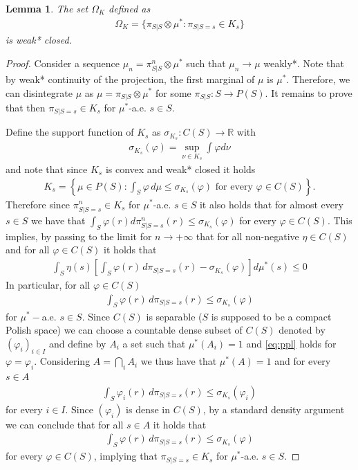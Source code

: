\documentclass{article}
\newcommand{\R}{\mathbb{R}} %
\newtheorem{lemma}[theorem]{Lemma}
\theoremstyle{definition}
\theoremstyle{remarksty}
\begin{document}
\begin{lemma}\label{lem:close}
    The set $\Omega_K$ defined as 
       \begin{align*}
  \Omega_K = \{\pi_{S|S} \otimes \mu^* : \pi_{S|S=s} \in K_s\}  
\end{align*}
    is weak* closed.
\end{lemma}
\begin{proof}
    Consider a sequence $\mu_n = \pi_{S|S}^n \otimes \mu^*$ such that $\mu_n \rightarrow \mu$ weakly*. Note that by weak* continuity of the projection, the first marginal of $\mu$ is $\mu^*$. Therefore, we can disintegrate $\mu$ as $\mu = \pi_{S|S} \otimes \mu^*$ for some $\pi_{S|S} : S \rightarrow P(S)$. It remains to prove that then $\pi_{S|S=s} \in K_s$ for $\mu^*$-a.e. $s\in S$.

    Define the support function of $K_s$ as $\sigma_{K_s} : C(S) \rightarrow \R$ with
    \begin{align*}
        \sigma_{K_s}(\varphi) = \sup_{\nu \in K_s} \int \varphi d\nu
    \end{align*}
    and note that since $K_s$ is convex and weak* closed it holds \cite[Theorem 7.51]{aliprantis_infinite_2006}
    \begin{align*}
        K_s=\left\{\mu\in P(S):\int_S \varphi\,d\mu\leq \sigma_{K_s}(\varphi)\text{ for every } \varphi \in C(S) \right\}.
    \end{align*}
    Therefore since $\pi^n_{S|S=s} \in K_s$ for $\mu^*$-a.e. $s\in S$ it also holds that for almost every $s \in S$ we have that $\int_S \varphi(r) d\pi^n_{S|S=s} (r) \leq \sigma_{K_s}(\varphi)$ for every $\varphi \in C(S)$. This implies, by passing to the limit for $n \rightarrow +\infty$ that for all non-negative $\eta \in C(S)$ and for all $\varphi \in C(S)$ it holds that 
\begin{align*}
\int_S \eta(s)
\left[
\int_S \varphi(r)\,d\pi_{S|S=s}(r)-\sigma_{K_s}(\varphi)
\right]d\mu^*(s)
\leq 0
\end{align*}
In particular, for all $\varphi \in C(S)$ 
\begin{align}\label{eq:ppl}
   \int_S \varphi(r)\,d\pi_{S|S=s}(r)
\leq \sigma_{K_s}(\varphi)
\end{align}
for $\mu^*-$a.e. $s\in S$.  Since $C(S)$ is separable ($S$ is supposed to be a compact Polish space) we can choose a countable dense subset of $C(S)$ denoted by $(\varphi_i)_{i \in I}$ and define by $A_i$ a set such that $\mu^*(A_i) = 1$ and \eqref{eq:ppl} holds for $\varphi = \varphi_i$. Considering $A = \bigcap_i A_i$ we thus have that $\mu^*(A) = 1$ and for every $s \in A$
\begin{align}\label{eq:ppl2}
   \int_S \varphi_i(r)\,d\pi_{S|S=s}(r)
\leq \sigma_{K_s}(\varphi_i)
\end{align}
for every $i \in I$. Since $(\varphi_i)$ is dense in $C(S)$, by a standard density argument we can conclude that for all $s\in A$ it holds that 
\begin{align}\label{eq:ppl3}
   \int_S \varphi(r)\,d\pi_{S|S=s}(r)
\leq \sigma_{K_s}(\varphi)
\end{align}
for every $\varphi \in C(S)$, implying that $\pi_{S|S=s}\in K_s$ for $\mu^*$-a.e. $s \in S$.
\end{proof}
\end{document}

